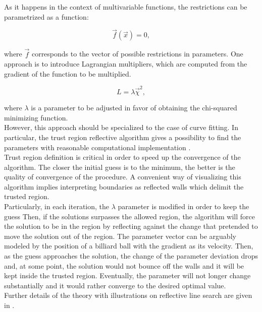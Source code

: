 \documentclass[openany]{book}
\begin{document}
As it happens in the context of multivariable functions, the restrictions can be parametrized as a function:

\begin{equation}\label{eq:fittingRestrictions}
	\vec f(\vec x) = 0,
\end{equation}

where $\vec f$ corresponds to the vector of possible restrictions in parameters. One approach is to introduce Lagrangian multipliers, which are computed from the gradient of the function to be multiplied.
 
\begin{equation}\label{eq:fittingLagrangeMultiplier}
	L = \lambda \vec \chi^2,
\end{equation}

where $\lambda$ is a parameter to be adjusted in favor of obtaining the chi-squared minimizing function. \\

However, this approach should be specialized to the case of curve fitting. In particular, the trust region reflective algorithm gives a possibility to find the parameters with reasonable computational implementation \cite{branch_coleman_li_1999}. \\

Trust region definition is critical in order to speed up the convergence of the algorithm. The closer the initial guess is to the minimum, the better is the quality of convergence of the procedure.   A convenient way of visualizing this algorithm implies interpreting boundaries as reflected walls which delimit the trusted region. \\ 

Particularly, in each iteration, the $\lambda$ parameter is modified in order to keep the guess
Then, if the solutions surpasses the allowed region, the algorithm will force the solution to be in the region by reflecting against the change that pretended to move the solution out of the region. The parameter vector can be arguably modeled by the position of a billiard ball with the gradient as its velocity.  Then, as the guess approaches the solution, the change of the parameter deviation drops and, at some point, the solution would not bounce off the walls and it will be kept inside the trusted region. Eventually, the parameter will not longer change substantially and it would rather converge to the desired optimal value. \\

Further details of the  theory with illustrations on reflective line search are given in \cite{coleman_li_1994}. 
\end{document}
